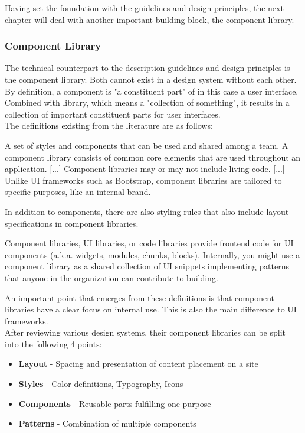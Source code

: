 Having set the foundation with the guidelines and design principles, the next chapter will deal with another important building block, the component library.
\subsubsection{Component Library}
The technical counterpart to the description guidelines and design principles is the component library. Both cannot exist in a design system without each other.  By definition, a component is "a constituent part" \cite{component_definition} of in this case a user interface.  Combined with library, which means a "collection of something"\cite{library_definition}, it results in a collection of important constituent parts for user interfaces.  \\
The definitions existing from the literature are as follows:
\begin{tcolorbox}[title=Definition of component library by \citet*{vesselov_building_2019}]
A set of styles and components that can be used and shared among a team. A component library consists of common core elements that are used throughout an application. [...] Component libraries may or may not include living code. [...] Unlike UI frameworks such as Bootstrap, component libraries are tailored to specific purposes, like an internal brand.
\end{tcolorbox}
In addition to components, there are also styling rules that also include layout specifications in component libraries. 
\begin{tcolorbox}[title=Definition of component library by \citet*{macdonald_practical_2019}]
Component libraries, UI libraries, or code libraries provide frontend code for UI components (a.k.a. widgets, modules, chunks, blocks). Internally, you might use a component library as a shared collection of UI snippets implementing patterns that anyone in the organization can contribute to building.
\end{tcolorbox}
An important point that emerges from these definitions is that component libraries have a clear focus on internal use. This is also the main difference to UI frameworks. \\
After reviewing various design systems, their component libraries can be split into the following 4 points:
\begin{itemize}
	\item \textbf{Layout} - Spacing and presentation of content placement on a site
	\item \textbf{Styles} - Color definitions, Typography, Icons
	\item \textbf{Components} - Reusable parts fulfilling one purpose
	\item \textbf{Patterns} - Combination of multiple components 
\end{itemize}


